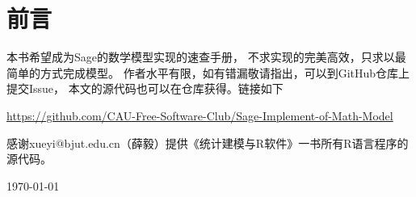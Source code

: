 \section*{前言}
本书希望成为Sage的数学模型实现的速查手册，
不求实现的完美高效，只求以最简单的方式完成模型。
作者水平有限，如有错漏敬请指出，可以到GitHub仓库上提交Issue，
本文的源代码也可以在仓库获得。链接如下

\href{https://github.com/CAU-Free-Software-Club/Sage-Implement-of-Math-Model}{https://github.com/CAU-Free-Software-Club/Sage-Implement-of-Math-Model}

感谢xueyi@bjut.edu.cn（薛毅）提供《统计建模与R软件》一书所有R语言程序的源代码。

\begin{flushright}
\today
\end{flushright}

